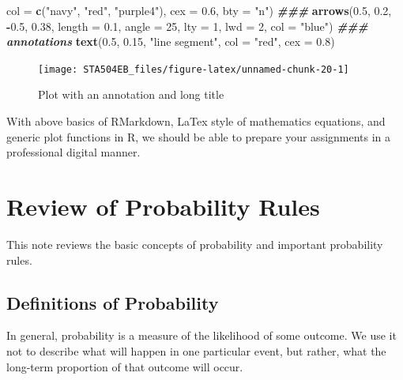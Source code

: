 \documentclass[
]{book}
\newenvironment{Shaded}{\begin{snugshade}}{\end{snugshade}}
\newcommand{\AttributeTok}[1]{\textcolor[rgb]{0.13,0.29,0.53}{#1}}
\newcommand{\DecValTok}[1]{\textcolor[rgb]{0.00,0.00,0.81}{#1}}
\newcommand{\DocumentationTok}[1]{\textcolor[rgb]{0.56,0.35,0.01}{\textbf{\textit{#1}}}}
\newcommand{\FloatTok}[1]{\textcolor[rgb]{0.00,0.00,0.81}{#1}}
\newcommand{\FunctionTok}[1]{\textcolor[rgb]{0.13,0.29,0.53}{\textbf{#1}}}
\newcommand{\NormalTok}[1]{#1}
\newcommand{\SpecialCharTok}[1]{\textcolor[rgb]{0.81,0.36,0.00}{\textbf{#1}}}
\newcommand{\StringTok}[1]{\textcolor[rgb]{0.31,0.60,0.02}{#1}}
\begin{document}
\begin{Shaded}
\begin{Highlighting}[]
       \AttributeTok{col =} \FunctionTok{c}\NormalTok{(}\StringTok{"navy"}\NormalTok{, }\StringTok{"red"}\NormalTok{, }\StringTok{"purple4"}\NormalTok{), }\AttributeTok{cex =} \FloatTok{0.6}\NormalTok{, }\AttributeTok{bty =} \StringTok{"n"}\NormalTok{)}
\DocumentationTok{\#\#\#}
\FunctionTok{arrows}\NormalTok{(}\FloatTok{0.5}\NormalTok{, }\FloatTok{0.2}\NormalTok{, }\SpecialCharTok{{-}}\FloatTok{0.5}\NormalTok{, }\FloatTok{0.38}\NormalTok{,  }\AttributeTok{length =} \FloatTok{0.1}\NormalTok{, }\AttributeTok{angle =} \DecValTok{25}\NormalTok{, }\AttributeTok{lty =} \DecValTok{1}\NormalTok{, }\AttributeTok{lwd =} \DecValTok{2}\NormalTok{, }
       \AttributeTok{col =} \StringTok{"blue"}\NormalTok{)}
\DocumentationTok{\#\#\# annotations}
\FunctionTok{text}\NormalTok{(}\FloatTok{0.5}\NormalTok{, }\FloatTok{0.15}\NormalTok{, }\StringTok{"line segment"}\NormalTok{, }\AttributeTok{col =} \StringTok{"red"}\NormalTok{, }\AttributeTok{cex =} \FloatTok{0.8}\NormalTok{)}
\end{Highlighting}
\end{Shaded}

\begin{figure}

{\centering \texttt{[image: STA504EB\_files/figure-latex/unnamed-chunk-20-1]} 

}

\caption{Plot with an annotation and long title}\label{fig:unnamed-chunk-20}
\end{figure}

\hfill\break

With above basics of RMarkdown, LaTex style of mathematics equations, and generic plot functions in R, we should be able to prepare your assignments in a professional digital manner.

\hypertarget{review-of-probability-rules}{%
\chapter{Review of Probability Rules}\label{review-of-probability-rules}}

This note reviews the basic concepts of probability and important probability rules.

\hypertarget{definitions-of-probability}{%
\section{Definitions of Probability}\label{definitions-of-probability}}

In general, probability is a measure of the likelihood of some outcome. We use it not to describe what will happen in one particular event, but rather, what the long-term proportion of that outcome will occur.
\end{document}
